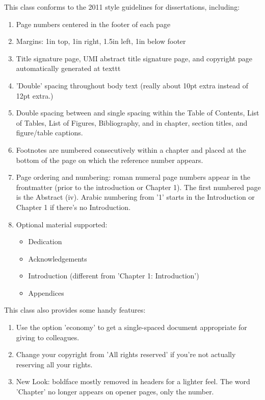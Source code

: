 This class conforms to the 2011 style guidelines for dissertations,
including:
\begin{enumerate}
\item Page numbers centered in the footer of each page
\item Margins: 1in top, 1in right, 1.5in left, 1in below footer
\item Title signature page, UMI abstract title signature page, and copyright
   page automatically generated at texttt{ \maketitle }
\item 'Double' spacing throughout body text (really about 10pt extra instead
   of 12pt extra.)
\item Double spacing between and single spacing within the Table of Contents, List of Tables, List of
   Figures, Bibliography, and in chapter, section titles, and figure/table
   captions.
\item Footnotes are numbered consecutively within a chapter and placed at the
   bottom of the page on which the reference number appears.
\item Page ordering and numbering: roman numeral page numbers appear
   in the frontmatter (prior to the introduction or Chapter 1).  The first
   numbered page is the Abstract (iv).  Arabic numbering from '1'
   starts in the Introduction or Chapter 1 if there's no Introduction.
\item Optional material supported:
	\begin{itemize}
   \item Dedication
   \item Acknowledgements
   \item Introduction (different from 'Chapter 1: Introduction')
   \item Appendices
	\end{itemize}
\end{enumerate}

This class also provides some handy features:
\begin{enumerate}
\item Use the option 'economy' to get a single-spaced document appropriate for
   giving to colleagues.
\item Change your copyright from 'All rights reserved' if you're not actually
   reserving all your rights.
\item New Look: boldface mostly removed in headers for a lighter feel.
   The word 'Chapter' no longer appears on opener pages, only the number.
\end{enumerate}

